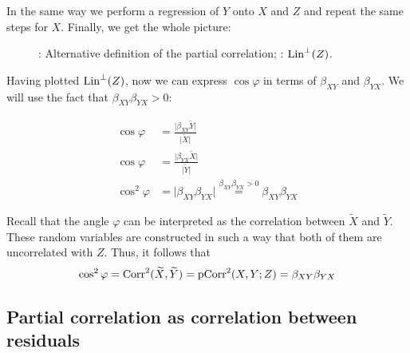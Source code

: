 In the same way we perform a regression of $Y$ onto $X$ and $Z$ and repeat the
same steps for $X$. Finally, we get the whole picture:

\begin{figure}[ht!]
\begin{center}
\caption{: Alternative definition of the partial correlation;
: $\operatorname{Lin}^{\perp}(Z)$.}
\end{center}
\end{figure}

Having plotted $\operatorname{Lin}^{\perp}(Z)$, now we can express $\cos \varphi$ in terms of $\beta_{XY}$
and $\beta_{YX}$. We will use the fact that $\beta_{XY} \beta_{YX} > 0$:

\begin{equation*}%
\begin{split}
\cos \varphi &= \frac{\vert \beta_{XY} \widetilde Y \vert}{\vert \widetilde X \vert} \\
\cos \varphi &= \frac{\vert \beta_{YX} \widetilde X \vert}{\vert \widetilde Y \vert} \\
\cos^2 \varphi &= \vert \beta_{XY} \beta_{YX} \vert \stackrel{\beta_{XY} \beta_{YX} > 0}{=} \beta_{XY} \beta_{YX}
\end{split}
\end{equation*}

Recall that the angle $\varphi$ can be interpreted as the correlation
between $\widetilde X$ and $\widetilde Y$.
These random variables are constructed in such a way that both of them
are uncorrelated with $Z$. Thus, it follows that
\[
\cos^2 \varphi = \operatorname{Corr}^2(\widetilde X, \widetilde Y) = \operatorname{pCorr}^2(X,Y; Z) = \beta_{XY} \beta_{YX}
\]

\subsection{Partial correlation as correlation between residuals}




